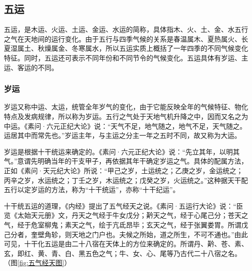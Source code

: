 \documentclass[12pt]{ctexbook}
\begin{document}
\subsection{五运}%

五运，是木运、火运、土运、金运、水运的简称，具体指木、火、土、金、水五行之气在天地间的运行变化。由于五行与四季气候的关系是春温属木、夏热属火、长夏湿属土、秋燥属金、冬寒属水，所以五运实质上概括了一年四季的不同气候变化特征。同时，五运还可表示不同年份和不同节令的气候变化。五运具体有岁运、主运、客运的不同。

\subsubsection{岁运}%

岁运又称中运、太运，统管全年岁气的变化，由于它能反映全年的气候特征、物化特点及发病规律，所以称为岁运。五行之气处于天地气机升降之中，因而又名之为中运。《素问·六元正纪大论》说：“天气不足，地气随之，地气不足，天气随之。运居其中而常先也。”岁运主年，与主运之分主一年之五时不同，故又称为大运。

岁运是根据十干统运来确定的。《素问·六元正纪大论》说：“先立其年，以明其气。”意谓先明确当年的干支甲子，再依据其年干确定岁运之气。具体的配属方法，正如《素问·天元纪大论》所说：“甲己之岁，土运统之；乙庚之岁，金运统之；丙辛之岁，水运统之；丁壬之岁，木运统之；戊癸之岁，火运统之。”这种据天干配五行以定岁运的方法，称为“十干统运”，亦称“十干纪运”。

十干统五运的道理，《内经》提出了五气经天之说。《素问·五运行大论》说：“臣览《太始天元册》文，丹天之气经于牛女戊分；黅天之气，经于心尾己分；苍天之气，经于危室柳鬼；素天之气，绘于亢氐昂毕；玄天之气，经于张翼娄胃。所谓戊己分者，奎壁角轸，则天地之门户也。夫候之所始，道之所生，不可不通也。”由此可见，十干化五运是由二十八宿在天体上的方位来确定的。所谓丹、黅、苍、素、玄，即红、黄、青、白、黑五色之气；牛、女、心、尾等乃古代二十八宿之名。（图\ref{fig:五气经天图}）
\end{document}

